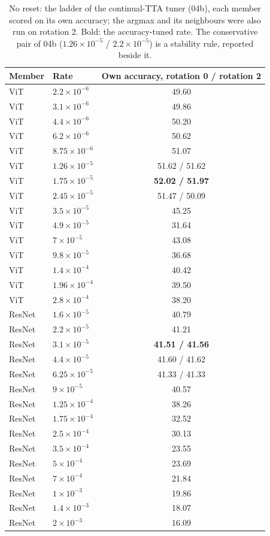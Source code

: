 \begin{table}[t]
  \centering\small
  \begin{tabular}{@{}llc@{}}
    \toprule
    Member & Rate & Own accuracy, rotation 0 / rotation 2 \\
    \midrule
    ViT & $2.2\!\times\!10^{-6}$ & 49.60 \\
    ViT & $3.1\!\times\!10^{-6}$ & 49.86 \\
    ViT & $4.4\!\times\!10^{-6}$ & 50.20 \\
    ViT & $6.2\!\times\!10^{-6}$ & 50.62 \\
    ViT & $8.75\!\times\!10^{-6}$ & 51.07 \\
    ViT & $1.26\!\times\!10^{-5}$ & 51.62 / 51.62 \\
    ViT & $1.75\!\times\!10^{-5}$ & \textbf{52.02 / 51.97} \\
    ViT & $2.45\!\times\!10^{-5}$ & 51.47 / 50.09 \\
    ViT & $3.5\!\times\!10^{-5}$ & 45.25 \\
    ViT & $4.9\!\times\!10^{-5}$ & 31.64 \\
    ViT & $7\!\times\!10^{-5}$ & 43.08 \\
    ViT & $9.8\!\times\!10^{-5}$ & 36.68 \\
    ViT & $1.4\!\times\!10^{-4}$ & 40.42 \\
    ViT & $1.96\!\times\!10^{-4}$ & 39.50 \\
    ViT & $2.8\!\times\!10^{-4}$ & 38.20 \\
    ResNet & $1.6\!\times\!10^{-5}$ & 40.79 \\
    ResNet & $2.2\!\times\!10^{-5}$ & 41.21 \\
    ResNet & $3.1\!\times\!10^{-5}$ & \textbf{41.51 / 41.56} \\
    ResNet & $4.4\!\times\!10^{-5}$ & 41.60 / 41.62 \\
    ResNet & $6.25\!\times\!10^{-5}$ & 41.33 / 41.33 \\
    ResNet & $9\!\times\!10^{-5}$ & 40.57 \\
    ResNet & $1.25\!\times\!10^{-4}$ & 38.26 \\
    ResNet & $1.75\!\times\!10^{-4}$ & 32.52 \\
    ResNet & $2.5\!\times\!10^{-4}$ & 30.13 \\
    ResNet & $3.5\!\times\!10^{-4}$ & 23.55 \\
    ResNet & $5\!\times\!10^{-4}$ & 23.69 \\
    ResNet & $7\!\times\!10^{-4}$ & 21.84 \\
    ResNet & $1\!\times\!10^{-3}$ & 19.86 \\
    ResNet & $1.4\!\times\!10^{-3}$ & 18.07 \\
    ResNet & $2\!\times\!10^{-3}$ & 16.09 \\
    \bottomrule
  \end{tabular}
  \caption{No reset: the ladder of the continual-TTA tuner (04b), each member scored on its own accuracy; the argmax and its neighbours were also run on rotation 2. Bold: the accuracy-tuned rate. The conservative pair of 04b ($1.26\!\times\!10^{-5}$ / $2.2\!\times\!10^{-5}$) is a stability rule, reported beside it.}
  \label{tab:tune_noreset}
\end{table}
